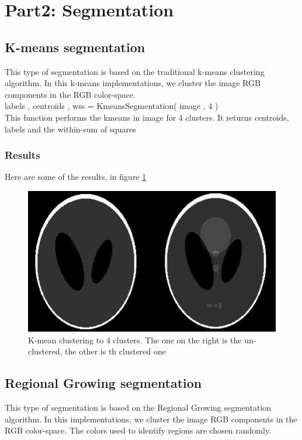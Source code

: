 \documentclass[letterpaper, 12 pt, conference ,onecolumn]{ieeeconf}  %
\begin{document}
\section{Part2: Segmentation}

\subsection*{K-means segmentation}
This type of segmentation is based on the traditional k-means clustering algorithm. In this k-means implementations, we cluster the image RGB components in the RGB color-space. \\
labels , centroids , wss = KmeansSegmentation( image , 4  )
\\
This function performs the kmeans in image for 4 clusters. It returns centroids, labels and the within-sum of squares


\subsubsection*{\textbf{Results}}  

Here are some of the results, in figure \ref{fig:Xray-kmean-4}
\begin{figure}[h!]
\includegraphics[width=0.4\paperwidth]{kmeans/kmean-4}
\centering
\caption{K-mean clustering to 4 clusters. The one on the right is the un-clustered, the other is th clustered one}
\label{fig:Xray-kmean-4}
\end{figure}

\subsection*{Regional Growing segmentation}
This type of segmentation is based on the Regional Growing segmentation algorithm. In this  implementations, we cluster the image RGB components in the RGB color-space. The colors used to identify regions are chosen randomly.\\
\end{document}
